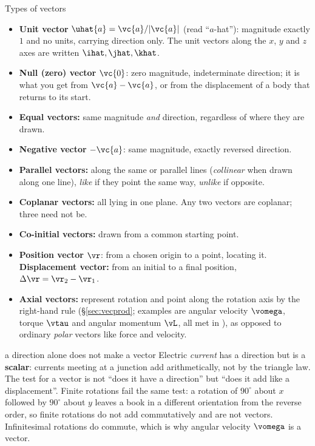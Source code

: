 \begin{defbox}{Types of vectors}
\begin{itemize}
\item \textbf{Unit vector} $\uhat{a}=\vc{a}/|\vc{a}|$ (read ``$a$-hat''): magnitude exactly $1$ and no
      units, carrying direction only. The unit vectors along the $x$, $y$ and $z$ axes are written
      $\ihat,\jhat,\khat$.
\item \textbf{Null (zero) vector} $\vc{0}$: zero magnitude, indeterminate direction; it is what you get from
      $\vc{a}-\vc{a}$, or from the displacement of a body that returns to its start.
\item \textbf{Equal vectors:} same magnitude \emph{and} direction, regardless of where they are drawn.
\item \textbf{Negative vector} $-\vc{a}$: same magnitude, exactly reversed direction.
\item \textbf{Parallel vectors:} along the same or parallel lines (\emph{collinear} when drawn along
      one line), \emph{like} if they
      point the same way, \emph{unlike} if opposite.
\item \textbf{Coplanar vectors:} all lying in one plane. Any two vectors are coplanar; three need
      not be.
\item \textbf{Co-initial vectors:} drawn from a common starting point.
\item \textbf{Position vector} $\vr$: from a chosen origin to a point, locating it.
      \textbf{Displacement vector:} from an initial to a final position, $\Delta\vr=\vr_2-\vr_1$.
\item \textbf{Axial vectors:} represent rotation and point along the rotation axis by the right-hand
      rule (\S\ref{sec:vecprod}; examples are angular velocity $\vomega$, torque $\vtau$ and angular momentum $\vL$, all met in
      ), as opposed to ordinary \emph{polar} vectors like force and
      velocity.
\end{itemize}
\end{defbox}

\begin{figure}[htbp]
\centering
{}
\end{figure}

\begin{trapbox}{a direction alone does not make a vector}
Electric \emph{current} has a direction but is a \textbf{scalar}: currents meeting at a junction add
arithmetically, not by the triangle law. The test for a vector is not ``does it have a direction'' but
``does it add like a displacement''. Finite rotations fail the same test: a rotation of $90^\circ$
about $x$ followed by $90^\circ$ about $y$ leaves a book in a different orientation from the reverse
order, so finite rotations do not add commutatively and are not vectors. Infinitesimal rotations do
commute, which is why angular velocity $\vomega$ is a vector.
\end{trapbox}

